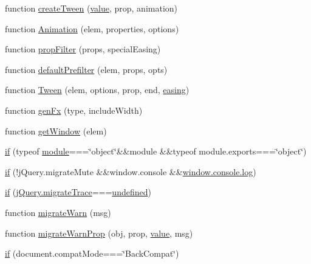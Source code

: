 \begin{DoxyCompactItemize}
\item 
function \hyperlink{jquery-1_8x_8js_a0c2043fcd2fa684768877127fbbc2e55}{create\+Tween} (\hyperlink{common_2js_2jquery_8js_abe5393d870043cf6aaa1d5ad5fce755c}{value}, prop, animation)
\item 
function \hyperlink{jquery-1_8x_8js_aa33f7dcb8ee41587d545a0bc69849296}{Animation} (elem, properties, options)
\item 
function \hyperlink{jquery-1_8x_8js_a0196d1f08ae60b747901b5a2950f72f1}{prop\+Filter} (props, special\+Easing)
\item 
function \hyperlink{jquery-1_8x_8js_a8041b1040535dcee84ad474aaaf11dde}{default\+Prefilter} (elem, props, opts)
\item 
function \hyperlink{jquery-1_8x_8js_adcb517ce3709049d37bb5f5bd3811edf}{Tween} (elem, options, prop, end, \hyperlink{jquery-1_8x_8js_a9758a312629fa6de1744280dd6e6253b}{easing})
\item 
function \hyperlink{jquery-1_8x_8js_a0dad9ae6c57fd32a071de202faa87081}{gen\+Fx} (type, include\+Width)
\item 
function \hyperlink{jquery-1_8x_8js_ab8e6e1fb3b8b51b6afe437c63df0e09f}{get\+Window} (elem)
\item 
\hyperlink{jquery-1_8x_8js_aa2cebb51f03a2e3ab2af45a3f9241c96}{if} (typeof \hyperlink{classmodule}{module}===\char`\"{}object\char`\"{}\&\&module \&\&typeof module.\+exports===\char`\"{}object\char`\"{})
\item 
\hyperlink{jquery-1_8x_8js_ad10d0bcf3030078a7152ff4fb299cafd}{if} (!j\+Query.\+migrate\+Mute \&\&window.\+console \&\&\hyperlink{jquery-1_8x_8min_8js_aab8655c63335be4154bdc4165547623e}{window.\+console.\+log})
\item 
\hyperlink{jquery-1_8x_8js_a1c581eba65fdd637cf79589b2ed4b1bc}{if} (\hyperlink{jquery-1_8x_8min_8js_a6965eb7cecccff575d9c9b1a65e4623f}{j\+Query.\+migrate\+Trace}===\hyperlink{menu_2tpl_2js_2jquery_8tmpl_8js_a08113a236cc18d2a9d5ce27e638012be}{undefined})
\item 
function \hyperlink{jquery-1_8x_8js_ac6036b3100bb484f96bfb15165e077f9}{migrate\+Warn} (msg)
\item 
function \hyperlink{jquery-1_8x_8js_a8b7e87f655ec77e18e32e4847c8a1038}{migrate\+Warn\+Prop} (obj, prop, \hyperlink{common_2js_2jquery_8js_abe5393d870043cf6aaa1d5ad5fce755c}{value}, msg)
\item 
\hyperlink{jquery-1_8x_8js_ad54a877e9064a2054702ad5fcf92cc9b}{if} (document.\+compat\+Mode===\char`\"{}Back\+Compat\char`\"{})
\item 

\end{DoxyCompactItemize}
